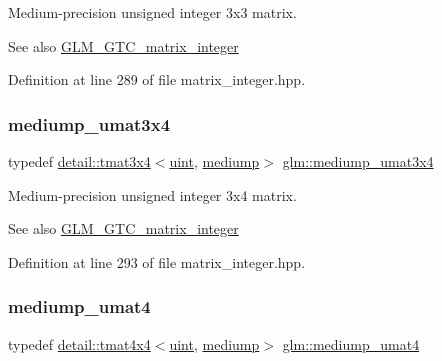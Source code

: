 Medium-\/precision unsigned integer 3x3 matrix. \begin{DoxySeeAlso}{See also}
\hyperlink{group__gtc__matrix__integer}{G\+L\+M\+\_\+\+G\+T\+C\+\_\+matrix\+\_\+integer} 
\end{DoxySeeAlso}


Definition at line 289 of file matrix\+\_\+integer.\+hpp.

\mbox{\label{group__gtc__matrix__integer_ga8113e067e1f327fac64cf9015c8c5431}} 
\subsubsection{\texorpdfstring{mediump\+\_\+umat3x4}{mediump\_umat3x4}}
{\footnotesize\ttfamily typedef \hyperlink{structglm_1_1detail_1_1tmat3x4}{detail\+::tmat3x4}$<$\hyperlink{group__core__precision_ga4fd29415871152bfb5abd588334147c8}{uint}, \hyperlink{namespaceglm_a0f04f086094c747d227af4425893f545a6416f3ea0c9025fb21ed50c4d6620482}{mediump}$>$ \hyperlink{group__gtc__matrix__integer_ga8113e067e1f327fac64cf9015c8c5431}{glm\+::mediump\+\_\+umat3x4}}

Medium-\/precision unsigned integer 3x4 matrix. \begin{DoxySeeAlso}{See also}
\hyperlink{group__gtc__matrix__integer}{G\+L\+M\+\_\+\+G\+T\+C\+\_\+matrix\+\_\+integer} 
\end{DoxySeeAlso}


Definition at line 293 of file matrix\+\_\+integer.\+hpp.

\mbox{\label{group__gtc__matrix__integer_gac82f1c426fbca1c4989f0985eb7a4358}} 
\subsubsection{\texorpdfstring{mediump\+\_\+umat4}{mediump\_umat4}}
{\footnotesize\ttfamily typedef \hyperlink{structglm_1_1detail_1_1tmat4x4}{detail\+::tmat4x4}$<$\hyperlink{group__core__precision_ga4fd29415871152bfb5abd588334147c8}{uint}, \hyperlink{namespaceglm_a0f04f086094c747d227af4425893f545a6416f3ea0c9025fb21ed50c4d6620482}{mediump}$>$ \hyperlink{group__gtc__matrix__integer_gac82f1c426fbca1c4989f0985eb7a4358}{glm\+::mediump\+\_\+umat4}}

